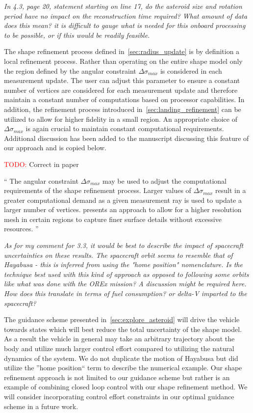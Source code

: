 \documentclass[11pt]{article}
\newcommand{\todo}{{\large \textcolor{red}{TODO: }}}
\newenvironment{correction}{\begin{list}{}{\setlength{\leftmargin}{1cm}\setlength{\rightmargin}{1cm}}\vspace{\parsep}\item[]``}{''\end{list}}
\newcommand{\comment}[1]{\item \itshape #1 \normalfont}
\begin{document}
\begin{itemize}
\comment{
In 4.3, page 20, statement starting on line 17, do the asteroid size and rotation period have no impact on the reconstruction time required? 
What amount of data does this mean? 
it is difficult to gauge what is needed for this onboard processing to be possible, or if this would be readily feasible.
}

The shape refinement process defined in~\cref{sec:radius_update} is by definition a local refinement process.
Rather than operating on the entire shape model only the region defined by the angular constraint \( \Delta \sigma_{max}\) is considered in each measurement update. 
The user can adjust this parameter to ensure a constant number of vertices are considered for each measurement update and therefore maintain a constant number of computations based on processor capabilities. 
In addition, the refinement process introduced in~\cref{sec:landing_refinement} can be utilized to allow for higher fidelity in a small region.
An appropriate choice of \( \Delta \sigma_{max} \) is again crucial to maintain constant computational requirements.
Additional discussion has been added to the manuscript discussing this feature of our approach and is copied below.

\todo Correct in paper

\begin{correction}
    The angular constraint \( \Delta \sigma_{max} \) may be used to adjust the computational requirements of the shape refinement process.
    Larger values of \( \Delta \sigma_{max} \) result in a greater computational demand as a given measurement ray is used to update a larger number of vertices.
     presents an approach to allow for a higher resolution mesh in certain regions to capture finer surface details without excessive resources. 
\end{correction}

\comment{
As for my comment for 3.3, it would be best to describe the impact of spacecraft uncertainties on these results.
The spacecraft orbit seems to resemble that of Hayabusa - this is inferred from using the "home position" nomenclature. 
Is the technique best used with this kind of approach as opposed to following some orbits like what was done with the OREx mission? A discussion might be required here.
How does this translate in terms of fuel consumption? or delta-V imparted to the spacecraft?  
}

The guidance scheme presented in~\cref{sec:explore_asteroid} will drive the vehicle towards states which will best reduce the total uncertainty of the shape model.
As a result the vehicle in general may take an arbitrary trajectory about the body and utilize much larger control effort compared to utilizing the natural dynamics of the system. 
We do not duplicate the motion of Hayabusa but did utilize the ''home position`` term to describe the numerical example.
Our shape refinement approach is not limited to our guidance scheme but rather is an example of combining closed loop control with our shape refinement method.
We will consider incorporating control effort constraints in our optimal guidance scheme in a future work.


\end{itemize}
\end{document}
